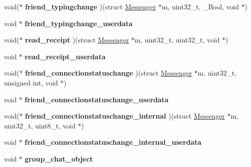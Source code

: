 \begin{DoxyCompactItemize}
\item 
\hypertarget{struct_messenger_a2d1cf25845a2a7d1b1f90916679fb4fe}{void($\ast$ {\bfseries friend\+\_\+typingchange} )(struct \hyperlink{struct_messenger}{Messenger} $\ast$m, uint32\+\_\+t, \+\_\+\+Bool, void $\ast$)}\label{struct_messenger_a2d1cf25845a2a7d1b1f90916679fb4fe}

\item 
\hypertarget{struct_messenger_a597c89e529b39b6f08251d586c1379e7}{void $\ast$ {\bfseries friend\+\_\+typingchange\+\_\+userdata}}\label{struct_messenger_a597c89e529b39b6f08251d586c1379e7}

\item 
\hypertarget{struct_messenger_aa90ada8f04c210bdf2a6da03422ef96b}{void($\ast$ {\bfseries read\+\_\+receipt} )(struct \hyperlink{struct_messenger}{Messenger} $\ast$m, uint32\+\_\+t, uint32\+\_\+t, void $\ast$)}\label{struct_messenger_aa90ada8f04c210bdf2a6da03422ef96b}

\item 
\hypertarget{struct_messenger_a82edcd1ba67ee440c38eb01b3003b900}{void $\ast$ {\bfseries read\+\_\+receipt\+\_\+userdata}}\label{struct_messenger_a82edcd1ba67ee440c38eb01b3003b900}

\item 
\hypertarget{struct_messenger_afb2bb77a40eb1445cc3e67cccc20a6ac}{void($\ast$ {\bfseries friend\+\_\+connectionstatuschange} )(struct \hyperlink{struct_messenger}{Messenger} $\ast$m, uint32\+\_\+t, unsigned int, void $\ast$)}\label{struct_messenger_afb2bb77a40eb1445cc3e67cccc20a6ac}

\item 
\hypertarget{struct_messenger_a69af1b3dc5153b752781cf61ff660b89}{void $\ast$ {\bfseries friend\+\_\+connectionstatuschange\+\_\+userdata}}\label{struct_messenger_a69af1b3dc5153b752781cf61ff660b89}

\item 
\hypertarget{struct_messenger_abfd5a34f887ae1fda52d86f4b01ea572}{void($\ast$ {\bfseries friend\+\_\+connectionstatuschange\+\_\+internal} )(struct \hyperlink{struct_messenger}{Messenger} $\ast$m, uint32\+\_\+t, uint8\+\_\+t, void $\ast$)}\label{struct_messenger_abfd5a34f887ae1fda52d86f4b01ea572}

\item 
\hypertarget{struct_messenger_af915663b78a533e88c4f56cacbeeefdc}{void $\ast$ {\bfseries friend\+\_\+connectionstatuschange\+\_\+internal\+\_\+userdata}}\label{struct_messenger_af915663b78a533e88c4f56cacbeeefdc}

\item 
\hypertarget{struct_messenger_accf717ba3e14c38e1611b17b78eed25c}{void $\ast$ {\bfseries group\+\_\+chat\+\_\+object}}\label{struct_messenger_accf717ba3e14c38e1611b17b78eed25c}


\end{DoxyCompactItemize}

